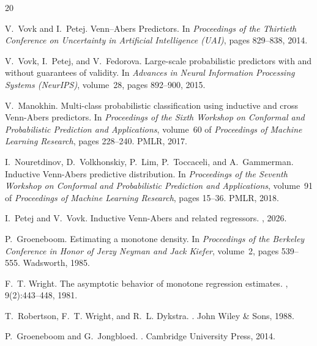\documentclass[11pt]{article}
\begin{document}
	
	\begin{thebibliography}{20}
		
		V.~Vovk and I.~Petej.
		\newblock Venn--Abers Predictors.
		\newblock In {\em Proceedings of the Thirtieth Conference on Uncertainty in Artificial Intelligence (UAI)}, pages 829--838, 2014.
		
		V.~Vovk, I.~Petej, and V.~Fedorova.
		\newblock Large-scale probabilistic predictors with and without guarantees of validity.
		\newblock In {\em Advances in Neural Information Processing Systems (NeurIPS)}, volume~28, pages 892--900, 2015.

		V.~Manokhin.
		\newblock Multi-class probabilistic classification using inductive and cross Venn-Abers predictors.
		\newblock In {\em Proceedings of the Sixth Workshop on Conformal and Probabilistic Prediction and Applications}, volume~60 of {\em Proceedings of Machine Learning Research}, pages 228--240. PMLR, 2017.

		I.~Nouretdinov, D.~Volkhonskiy, P.~Lim, P.~Toccaceli, and A.~Gammerman.
		\newblock Inductive Venn-Abers predictive distribution.
		\newblock In {\em Proceedings of the Seventh Workshop on Conformal and Probabilistic Prediction and Applications}, volume~91 of {\em Proceedings of Machine Learning Research}, pages 15--36. PMLR, 2018.

		I.~Petej and V.~Vovk.
		\newblock Inductive Venn-Abers and related regressors.
		, 2026.

		P.~Groeneboom.
		\newblock Estimating a monotone density.
		\newblock In {\em Proceedings of the Berkeley Conference in Honor of Jerzy Neyman and Jack Kiefer}, volume~2, pages 539--555. Wadsworth, 1985.

		F.~T. Wright.
		\newblock The asymptotic behavior of monotone regression estimates.
		, 9(2):443--448, 1981.
		
		T.~Robertson, F.~T. Wright, and R.~L. Dykstra.
		.
		\newblock John Wiley \& Sons, 1988.

		P.~Groeneboom and G.~Jongbloed.
		.
		\newblock Cambridge University Press, 2014.
		

\end{thebibliography}
\end{document}
